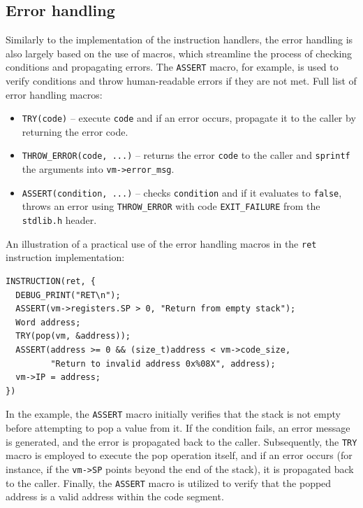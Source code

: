 \documentclass[10pt,a4paper,final]{article}
\newcommand{\code}[1]{\texttt{#1}}
\begin{document}
\subsection{Error handling}
\label{sec:errors}

Similarly to the implementation of the instruction handlers, the error handling
is also largely based on the use of macros, which streamline the process of
checking conditions and propagating errors. The \code{ASSERT} macro, for
example, is used to verify conditions and throw human-readable errors if they
are not met. Full list of error handling macros:

\begin{itemize}
  \item \code{TRY(code)} -- execute \code{code} and if an error
    occurs, propagate
    it to the caller by returning the error code.
  \item \code{THROW_ERROR(code, ...)} -- returns the error \code{code} to the
    caller and \code{sprintf} the arguments into \code{vm->error_msg}.
  \item \code{ASSERT(condition, ...)} -- checks \code{condition} and if it
    evaluates to \code{false}, throws an error using \code{THROW_ERROR} with
    code \code{EXIT_FAILURE} from the \code{stdlib.h} header.
\end{itemize}

An illustration of a practical use of the error handling macros in the
\code{ret} instruction implementation:

\begin{verbatim}
INSTRUCTION(ret, {
  DEBUG_PRINT("RET\n");
  ASSERT(vm->registers.SP > 0, "Return from empty stack");
  Word address;
  TRY(pop(vm, &address));
  ASSERT(address >= 0 && (size_t)address < vm->code_size,
         "Return to invalid address 0x%08X", address);
  vm->IP = address;
})
\end{verbatim}

In the example, the \code{ASSERT} macro initially verifies that the stack is not
empty before attempting to pop a value from it. If the condition fails, an error
message is generated, and the error is propagated back to the caller.
Subsequently, the \code{TRY} macro is employed to execute the pop operation
itself, and if an error occurs (for instance, if the \code{vm->SP} points beyond
the end of the stack), it is propagated back to the caller. Finally, the
\code{ASSERT} macro is utilized to verify that the popped address is a valid
address within the code segment.
\end{document}
